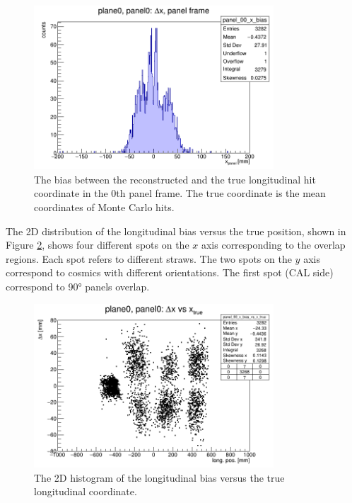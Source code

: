 \begin{figure}[!h]
    \centering
    \includegraphics[width=0.8\textwidth]{figures/png/panel_00_x_bias.png}
    \caption[The bias between the reconstructed and the true hit coordinate.]{The bias between the reconstructed 
    and the true longitudinal hit coordinate in the 0th panel frame. 
    The true coordinate is the mean coordinates of Monte Carlo hits.}
    \label{fig:bias}
\end{figure}
The 2D distribution of the longitudinal bias versus the true position, shown in 
Figure \ref{fig:rec2D}, shows four different spots on the $x$ axis corresponding to 
the overlap regions. Each spot refers to different straws. The two spots on the $y$ axis correspond to cosmics with different orientations. 
The first spot (CAL side) correspond to 90° panels overlap.
\begin{figure}[!h]
    \centering
    \includegraphics[width=0.8\textwidth]{figures/png/panel_00_x_bias_vs_x.png}
    \caption[The 2D histogram of the longitudinal bias versus the true coordinate.]{The 2D histogram of the longitudinal bias versus the true longitudinal coordinate.}
    \label{fig:rec2D}
\end{figure}
